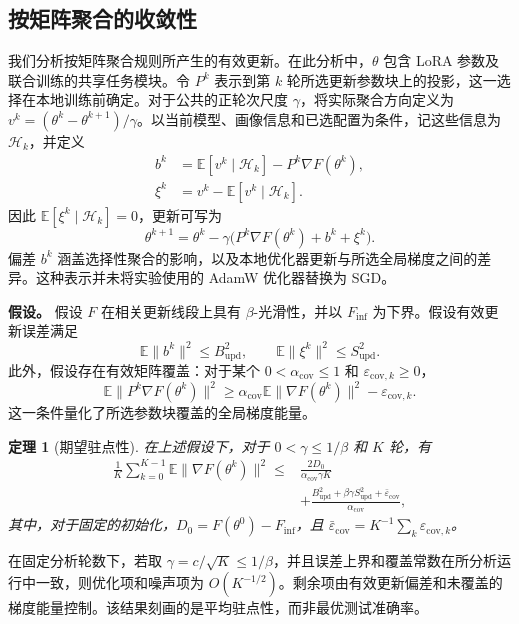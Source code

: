 \documentclass[10pt,conference,letterpaper]{IEEEtran}
\newtheorem{theorem}{定理}
\begin{document}
\subsection{按矩阵聚合的收敛性}
\label{sec:fm-convergence}
我们分析按矩阵聚合规则所产生的有效更新。在此分析中，$\theta$ 包含 LoRA 参数及联合训练的共享任务模块。令 $P^k$ 表示到第 $k$ 轮所选更新参数块上的投影，这一选择在本地训练前确定。对于公共的正轮次尺度 $\gamma$，将实际聚合方向定义为 $v^k=(\theta^k-\theta^{k+1})/\gamma$。以当前模型、画像信息和已选配置为条件，记这些信息为 $\mathcal H_k$，并定义
\begin{align}
 b^k&=\mathbb E[v^k\mid\mathcal H_k]-P^k\nabla F(\theta^k),\\
 \xi^k&=v^k-\mathbb E[v^k\mid\mathcal H_k].
\end{align}
因此 $\mathbb E[\xi^k\mid\mathcal H_k]=0$，更新可写为
\begin{equation}
 \theta^{k+1}=\theta^k-\gamma\bigl(P^k\nabla F(\theta^k)+b^k+\xi^k\bigr).
\end{equation}
偏差 $b^k$ 涵盖选择性聚合的影响，以及本地优化器更新与所选全局梯度之间的差异。这种表示并未将实验使用的 AdamW 优化器替换为 SGD。

\noindent\textbf{假设。}
假设 $F$ 在相关更新线段上具有 $\beta$-光滑性，并以 $F_{\inf}$ 为下界。假设有效更新误差满足
\begin{equation}
 \mathbb E\|b^k\|^2\le B_{\mathrm{upd}}^2,\qquad
 \mathbb E\|\xi^k\|^2\le S_{\mathrm{upd}}^2.
\end{equation}
此外，假设存在有效矩阵覆盖：对于某个 $0<\alpha_{\mathrm{cov}}\le1$ 和 $\varepsilon_{\mathrm{cov},k}\ge0$，
\begin{equation}
 \mathbb E\|P^k\nabla F(\theta^k)\|^2
 \ge\alpha_{\mathrm{cov}}\mathbb E\|\nabla F(\theta^k)\|^2
       -\varepsilon_{\mathrm{cov},k}.
\end{equation}
这一条件量化了所选参数块覆盖的全局梯度能量。

\begin{theorem}[期望驻点性]
\label{thm:fm-stationarity}
在上述假设下，对于 $0<\gamma\le1/\beta$ 和 $K$ 轮，有
\begin{align}
 \frac1K\sum_{k=0}^{K-1}\mathbb E\|\nabla F(\theta^k)\|^2
 \le{}&\frac{2D_0}{\alpha_{\mathrm{cov}}\gamma K}\\
 &+\frac{B_{\mathrm{upd}}^2+\beta\gamma S_{\mathrm{upd}}^2
              +\bar\varepsilon_{\mathrm{cov}}}{\alpha_{\mathrm{cov}}},\nonumber
\end{align}
其中，对于固定的初始化，$D_0=F(\theta^0)-F_{\inf}$，且
$\bar\varepsilon_{\mathrm{cov}}=K^{-1}\sum_k\varepsilon_{\mathrm{cov},k}$。
\end{theorem}
在固定分析轮数下，若取 $\gamma=c/\sqrt K\le1/\beta$，并且误差上界和覆盖常数在所分析运行中一致，则优化项和噪声项为 $O(K^{-1/2})$。剩余项由有效更新偏差和未覆盖的梯度能量控制。该结果刻画的是平均驻点性，而非最优测试准确率。
\end{document}

